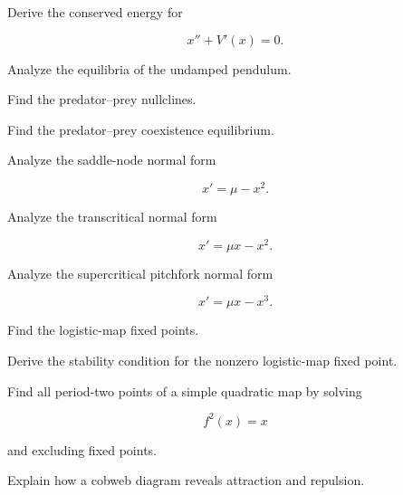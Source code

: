 \begin{exercise}[3]
Derive the conserved energy for

\[
x''+V'(x)=0.
\]
\end{exercise}

\begin{exercise}[3]
Analyze the equilibria of the undamped pendulum.
\end{exercise}

\begin{exercise}[3]
Find the predator--prey nullclines.
\end{exercise}

\begin{exercise}[3]
Find the predator--prey coexistence equilibrium.
\end{exercise}

\begin{exercise}[3]
Analyze the saddle-node normal form

\[
x'=\mu-x^2.
\]
\end{exercise}

\begin{exercise}[3]
Analyze the transcritical normal form

\[
x'=\mu x-x^2.
\]
\end{exercise}

\begin{exercise}[3]
Analyze the supercritical pitchfork normal form

\[
x'=\mu x-x^3.
\]
\end{exercise}

\begin{exercise}[3]
Find the logistic-map fixed points.
\end{exercise}

\begin{exercise}[3]
Derive the stability condition for the nonzero logistic-map fixed point.
\end{exercise}

\begin{exercise}[3]
Find all period-two points of a simple quadratic map by solving

\[
f^2(x)=x
\]

and excluding fixed points.
\end{exercise}

\begin{exercise}[3]
Explain how a cobweb diagram reveals attraction and repulsion.
\end{exercise}

